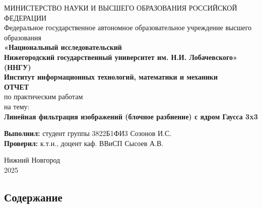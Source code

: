 \documentclass[14pt, a4paper]{extarticle}
\begin{document}
\onehalfspacing
\thispagestyle{empty}

\begin{spacing}{1.0}
\begin{center}
МИНИСТЕРСТВО НАУКИ И ВЫСШЕГО ОБРАЗОВАНИЯ РОССИЙСКОЙ ФЕДЕРАЦИИ \\

Федеральное государственное автономное образовательное учреждение высшего образования \\
\textbf{«Национальный исследовательский} \\
\textbf{Нижегородский государственный университет им. Н.И. Лобачевского»} \\

\textbf{(ННГУ)} \\[4ex]

\textbf{Институт информационных технологий, математики и механики} \\[18ex]

{\fontsize{18pt}{22pt}\selectfont\textbf{ОТЧЕТ}} \\[1ex]
по практическим работам \\[2ex]

на тему: \\[1ex]
{\fontsize{16pt}{20pt}\selectfont\textbf{Линейная фильтрация изображений (блочное разбиение) с ядром Гаусса 3x3}} \\[14ex]
\end{center}

\hspace*{0.45\textwidth}
\begin{minipage}{0.45\textwidth}
\textbf{Выполнил:} студент группы 3822Б1ФИ3 Созонов И.С.\\[2ex]

\textbf{Проверил:} к.т.н., доцент каф. ВВиСП Сысоев А.В.
\end{minipage}

\vfill

\begin{center}
Нижний Новгород \\
2025
\end{center}
\end{spacing}

\newpage

\begin{center}
\section*{Содержание}
\end{center}
\end{document}
